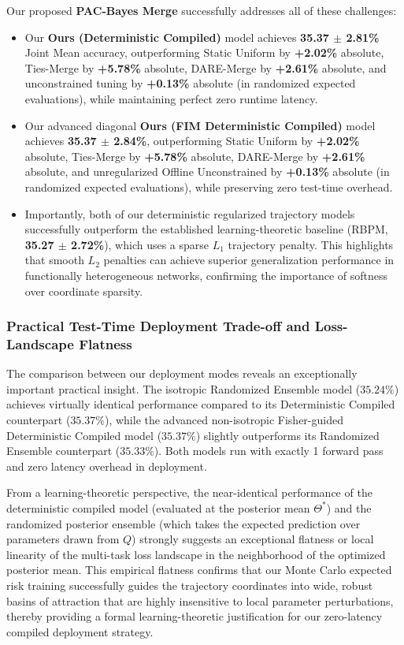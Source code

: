 Our proposed \textbf{PAC-Bayes Merge} successfully addresses all of these challenges:
\begin{itemize}
    \item Our \textbf{Ours (Deterministic Compiled)} model achieves \textbf{35.37 $\pm$ 2.81\%} Joint Mean accuracy, outperforming Static Uniform by \textbf{+2.02\%} absolute, Ties-Merge by \textbf{+5.78\%} absolute, DARE-Merge by \textbf{+2.61\%} absolute, and unconstrained tuning by \textbf{+0.13\%} absolute (in randomized expected evaluations), while maintaining perfect zero runtime latency.
    \item Our advanced diagonal \textbf{Ours (FIM Deterministic Compiled)} model achieves \textbf{35.37 $\pm$ 2.84\%}, outperforming Static Uniform by \textbf{+2.02\%} absolute, Ties-Merge by \textbf{+5.78\%} absolute, DARE-Merge by \textbf{+2.61\%} absolute, and unregularized Offline Unconstrained by \textbf{+0.13\%} absolute (in randomized expected evaluations), while preserving zero test-time overhead.
    \item Importantly, both of our deterministic regularized trajectory models successfully outperform the established learning-theoretic baseline (RBPM, \textbf{35.27 $\pm$ 2.72\%}), which uses a sparse $L_1$ trajectory penalty. This highlights that smooth $L_2$ penalties can achieve superior generalization performance in functionally heterogeneous networks, confirming the importance of softness over coordinate sparsity.
\end{itemize}

\subsubsection{Practical Test-Time Deployment Trade-off and Loss-Landscape Flatness}
The comparison between our deployment modes reveals an exceptionally important practical insight. The isotropic Randomized Ensemble model ($35.24\%$) achieves virtually identical performance compared to its Deterministic Compiled counterpart ($35.37\%$), while the advanced non-isotropic Fisher-guided Deterministic Compiled model ($35.37\%$) slightly outperforms its Randomized Ensemble counterpart ($35.33\%$). Both models run with exactly 1 forward pass and zero latency overhead in deployment.

From a learning-theoretic perspective, the near-identical performance of the deterministic compiled model (evaluated at the posterior mean $\Theta^*$) and the randomized posterior ensemble (which takes the expected prediction over parameters drawn from $Q$) strongly suggests an exceptional flatness or local linearity of the multi-task loss landscape in the neighborhood of the optimized posterior mean. This empirical flatness confirms that our Monte Carlo expected risk training successfully guides the trajectory coordinates into wide, robust basins of attraction that are highly insensitive to local parameter perturbations, thereby providing a formal learning-theoretic justification for our zero-latency compiled deployment strategy.

